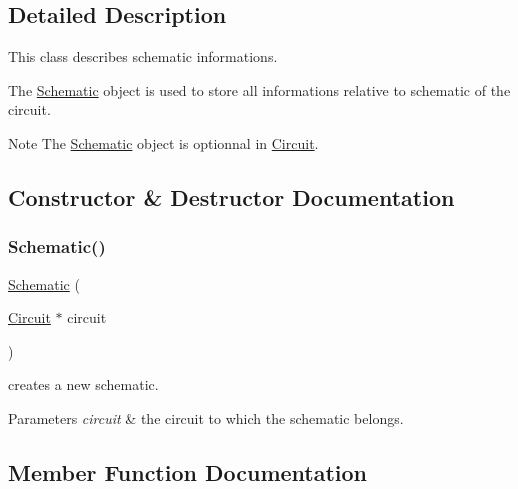 \subsection{Detailed Description}
This class describes schematic informations.

The \mbox{\hyperlink{class_open_chams_1_1_schematic}{Schematic}} object is used to store all informations relative to schematic of the circuit.

\begin{DoxyNote}{Note}
The \mbox{\hyperlink{class_open_chams_1_1_schematic}{Schematic}} object is optionnal in \mbox{\hyperlink{class_open_chams_1_1_circuit}{Circuit}}. 
\end{DoxyNote}


\subsection{Constructor \& Destructor Documentation}
\mbox{\label{class_open_chams_1_1_schematic_a88d7382ee58bc8d509a8f9b05a57e8b3}} 
\subsubsection{\texorpdfstring{Schematic()}{Schematic()}}
{\footnotesize\ttfamily \mbox{\hyperlink{class_open_chams_1_1_schematic}{Schematic}} (\begin{DoxyParamCaption}\item[{\mbox{\hyperlink{class_open_chams_1_1_circuit}{Circuit}} $\ast$}]{circuit }\end{DoxyParamCaption})}



creates a new schematic. 


\begin{DoxyParams}{Parameters}
{\em circuit} & the circuit to which the schematic belongs. \\
\hline
\end{DoxyParams}


\subsection{Member Function Documentation}
\mbox{\label{class_open_chams_1_1_schematic_ac7fc9f5cdf1e22c53d42e6606e1af8ef}} 
